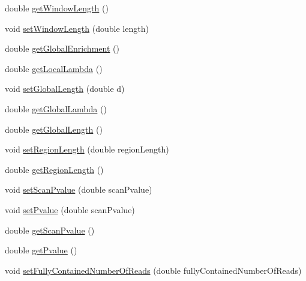 \begin{DoxyCompactItemize}
\item 
double \hyperlink{classumms_1_1core_1_1model_1_1score_1_1_basic_scan_statistic_score_a50cc80126179865c6817917bc58c3f43}{get\+Window\+Length} ()
\item 
void \hyperlink{classumms_1_1core_1_1model_1_1score_1_1_basic_scan_statistic_score_a4e1be5bcd2aa52ec9aee678d38c5dde9}{set\+Window\+Length} (double length)
\item 
double \hyperlink{classumms_1_1core_1_1model_1_1score_1_1_basic_scan_statistic_score_a7d0693db16d22a5bd0f5b746fcdb2b43}{get\+Global\+Enrichment} ()
\item 
double \hyperlink{classumms_1_1core_1_1model_1_1score_1_1_basic_scan_statistic_score_a67c56ac3e65e0c7868f64c05a5f8816c}{get\+Local\+Lambda} ()
\item 
void \hyperlink{classumms_1_1core_1_1model_1_1score_1_1_basic_scan_statistic_score_a613cd589583ed844d4859ab1d5364ece}{set\+Global\+Length} (double d)
\item 
double \hyperlink{classumms_1_1core_1_1model_1_1score_1_1_basic_scan_statistic_score_a6ebdc7a57a5a409e58a233de615036c2}{get\+Global\+Lambda} ()
\item 
double \hyperlink{classumms_1_1core_1_1model_1_1score_1_1_basic_scan_statistic_score_aea3afb594bc9f8eda886e0987285b504}{get\+Global\+Length} ()
\item 
void \hyperlink{classumms_1_1core_1_1model_1_1score_1_1_basic_scan_statistic_score_add821b493f0413c72b1395537ad655b5}{set\+Region\+Length} (double region\+Length)
\item 
double \hyperlink{classumms_1_1core_1_1model_1_1score_1_1_basic_scan_statistic_score_a1511649a2bcc63582bd0716df87fc2f8}{get\+Region\+Length} ()
\item 
void \hyperlink{classumms_1_1core_1_1model_1_1score_1_1_basic_scan_statistic_score_a5dde9b2f92c48594bfe07ad31cf6d9d9}{set\+Scan\+Pvalue} (double scan\+Pvalue)
\item 
void \hyperlink{classumms_1_1core_1_1model_1_1score_1_1_basic_scan_statistic_score_a7c14f611fbcdda2ecc3f09847faa8c00}{set\+Pvalue} (double scan\+Pvalue)
\item 
double \hyperlink{classumms_1_1core_1_1model_1_1score_1_1_basic_scan_statistic_score_abed9c5b27dd0af8fa6bb652d2964ebd8}{get\+Scan\+Pvalue} ()
\item 
double \hyperlink{classumms_1_1core_1_1model_1_1score_1_1_basic_scan_statistic_score_aeea11b84828ad35985eaf18ba6f76e1d}{get\+Pvalue} ()
\item 
void \hyperlink{classumms_1_1core_1_1model_1_1score_1_1_basic_scan_statistic_score_af831bbfb56ac03190d3bb92e7fe154a2}{set\+Fully\+Contained\+Number\+Of\+Reads} (double fully\+Contained\+Number\+Of\+Reads)

\end{DoxyCompactItemize}
